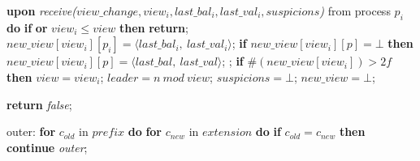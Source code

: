\begin{algorithm}
\begin{algorithmic}[1]
		\State\textbf{upon} \textit{receive($view\_change, view_i, last\_bal_i, last\_val_i, suspicions$)} from process $p_i$ \textbf{do} 
		\State\hspace{\algorithmicindent} \textbf{if}  \textbf{or} $view_i \leq view$ \textbf{then}
		\State\hspace{\algorithmicindent}\hspace{\algorithmicindent}\textbf{return};
		\State
		\State\hspace{\algorithmicindent} $new\_view[view_i][p_i] = \langle last\_bal_i,\ last\_val_i \rangle$;
		\State\hspace{\algorithmicindent} \textbf{if} $new\_view[view_i][p] = \bot$ \textbf{then}
		\State\hspace{\algorithmicindent}\hspace{\algorithmicindent} $new\_view[view_i][p] = \langle last\_bal,\ last\_val \rangle$;
		\State\hspace{\algorithmicindent}\hspace{\algorithmicindent}  ;
		\State
		\State\hspace{\algorithmicindent} \textbf{if} $\#(new\_view[view_i]) > 2f$ \textbf{then}
		\State\hspace{\algorithmicindent}\hspace{\algorithmicindent} $view = view_i$;
		\State\hspace{\algorithmicindent}\hspace{\algorithmicindent} $leader = n\ mod\ view$;
		\State\hspace{\algorithmicindent}\hspace{\algorithmicindent} $suspicions = \bot$;
		\State\hspace{\algorithmicindent}\hspace{\algorithmicindent} $new\_view = \bot$;

		
		\iffalse\State
		\State \textbf{return} \textit{false};
		\EndIf
		
		\State
		\item[] outer:	
		\State \textbf{for} $c_{old}$ in $prefix$ \textbf{do}
		\State \hspace{\algorithmicindent} \textbf{for} $c_{new}$ in $extension$ \textbf{do}
		\State\hspace{\algorithmicindent}\hspace{\algorithmicindent} \textbf{if} $c_{old} = c_{new}$ \textbf{then}
		\State \hspace{\algorithmicindent}\hspace{\algorithmicindent}\hspace{\algorithmicindent} \textbf{continue} \textit{outer};
		

\end{algorithmic}
\end{algorithm}

